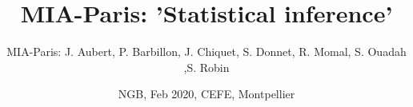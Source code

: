 \documentclass[8pt]{beamer}
\begin{document}
\title{MIA-Paris: 'Statistical inference'}
\author[MIA-Paris]{MIA-Paris: J. Aubert, P. Barbillon, J. Chiquet, S. Donnet, R. Momal, S. Ouadah ,S. Robin}
\date[NGB, Feb'20]{NGB, Feb 2020, CEFE, Montpellier}
\maketitle

\end{document}
